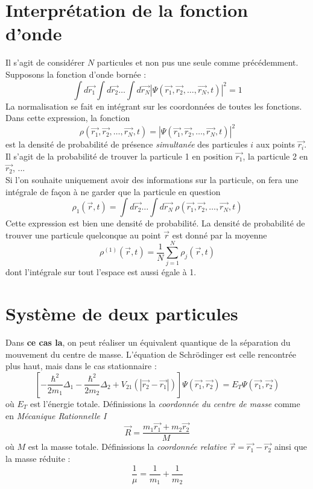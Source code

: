 \documentclass[british,french,11pt, a4paper, openany]{book}
\begin{document}
\section{Interprétation de la fonction d'onde}
Il s'agit de considérer $N$ particules et non pus une seule comme précédemment. Supposons la fonction d'onde bornée :
\begin{equation}
	\int d\vec{r_1}\int d\vec{r_2}\dots\int d\vec{r_N}|\Psi(\vec{r_1}, \vec{r_2}, \dots, \vec{r_N}, t)|^2 = 1
\end{equation}
La normalisation se fait en intégrant sur les coordonnées de toutes les fonctions. Dans cette expression, la fonction 
\begin{equation}
	\rho(\vec{r_1}, \vec{r_2}, \dots, \vec{r_N}, t)=|\Psi(\vec{r_1}, \vec{r_2}, \dots, \vec{r_N}, t)|^2
\end{equation}
est la densité de probabilité de présence \textit{simultanée} des particules $i$ aux points $\vec{r_i}$. Il s'agit de la probabilité de trouver la particule 1 en position $\vec{r_1}$, la particule 2 en $\vec{r_2}$, ...\\
Si l'on souhaite uniquement avoir des informations sur la particule, on fera une intégrale de façon à ne garder que la particule en question
\begin{equation}
	\rho_1(\vec{r},t) = \int d\vec{r_2}\dots\int d\vec{r_N}\ \rho(\vec{r_1}, \vec{r_2}, \dots, \vec{r_N}, t)
\end{equation}
Cette expression est bien une densité de probabilité. La densité de probabilité de trouver une particule quelconque au point $\vec{r}$ est donné par la moyenne
\begin{equation}
	\rho^{(1)}(\vec{r},t) = \frac{1}{N}\sum_{j=1}^N \rho_j(\vec{r},t)
\end{equation}
dont l'intégrale sur tout l'espace est aussi égale à 1.

\section{Système de deux particules}
Dans \textbf{ce cas la}, on peut réaliser un équivalent quantique de la séparation du mouvement du centre de masse. L'équation de Schrödinger est celle rencontrée plus haut, mais dans le cas stationnaire :
\begin{equation}
	\left[-\frac{\hbar^2}{2m_1}\Delta_1 - \frac{\hbar^2}{2m_2}\Delta_2 + V_{21}(|\vec{r_2}-\vec{r_1}|) \right]\Psi(\vec{r_1}, \vec{r_2}) = E_T \Psi(\vec{r_1}, \vec{r_2})
\end{equation}
où $E_T$ est l'énergie totale. Définissions la \textit{coordonnée du centre de masse} comme en \textit{Mécanique Rationnelle I}
\begin{equation}
	\vec{R} = \frac{m_1\vec{r_1}+m_2\vec{r_2}}{M}
\end{equation}
où $M$ est la masse totale. Définissions la \textit{coordonnée relative} $\vec{r} = \vec{r_1}-\vec{r_2}$ ainsi que la masse réduite :
\begin{equation}
	\frac{1}{\mu} = \frac{1}{m_1}+\frac{1}{m_2}
\end{equation}
\end{document}
